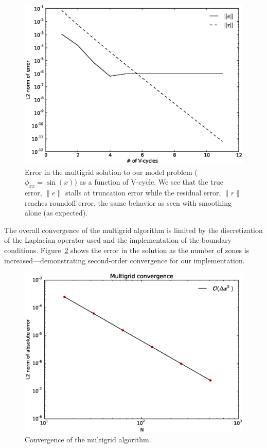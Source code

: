 \begin{figure}
\centering
\includegraphics[width=0.85\linewidth]{mg_error_vs_cycle}
\caption[Error in solution as a function of multigrid V-cycle
  number.]{\label{fig:mgerror} Error in the multigrid solution to our
  model problem ($\phi_{xx} = \sin(x)$) as a function of V-cycle.  We
  see that the true error, $\|e\|$ stalls at truncation error while
  the residual error, $\|r\|$ reaches roundoff error, the same
  behavior as seen with smoothing alone (as expected). \\
  }
\end{figure}

The overall convergence of the multigrid algorithm is limited by the
discretization of the Laplacian operator used and the implementation
of the boundary conditions.  Figure~\ref{fig:mg:convergence} shows
the error in the solution as the number of zones is increased---demonstrating
second-order convergence for our implementation.

\begin{figure}[t]
\centering
\includegraphics[width=0.85\linewidth]{mg-converge}
\caption[Convergence of the multigrid
  algorithm]{\label{fig:mg:convergence} Convergence of the multigrid
  algorithm. \\ 
  }
\end{figure}


